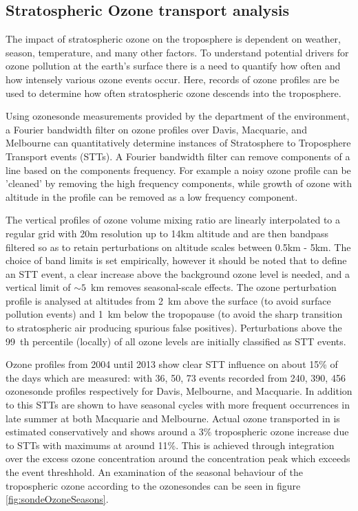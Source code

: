 \subsection{Stratospheric Ozone transport analysis}
The impact of stratospheric ozone on the troposphere is dependent on weather, season, temperature, and many other factors.
To understand potential drivers for ozone pollution at the earth's surface there is a need to quantify how often and how intensely various ozone events occur.
Here, records of ozone profiles are be used to determine how often stratospheric ozone descends into the troposphere.

Using ozonesonde measurements provided by the department of the environment, a Fourier bandwidth filter on ozone profiles over Davis, Macquarie, and Melbourne can quantitatively determine instances of Stratosphere to Troposphere Transport events (STTs).
A Fourier bandwidth filter can remove components of a line based on the components frequency.
For example a noisy ozone profile can be 'cleaned' by removing the high frequency components, while growth of ozone with altitude in the profile can be removed as a low frequency component. 

The vertical profiles of ozone volume mixing ratio are linearly interpolated to a regular grid with 20m resolution up to 14km altitude and are then bandpass filtered so as to retain perturbations on altitude scales between 0.5km - 5km. 
The choice of band limits is set empirically, however it should be noted that to define an STT event, a clear increase above the background ozone level is needed, and a vertical limit of $\sim 5$~km removes seasonal-scale effects. 
The ozone perturbation profile is analysed at altitudes from 2~km above the surface (to avoid surface pollution events) and 1~km below the tropopause (to avoid the sharp transition to stratospheric air producing spurious false positives).
Perturbations above the 99~th percentile (locally) of all ozone levels are initially classified as STT events.

Ozone profiles from 2004 until 2013 show clear STT influence on about 15\% of the days which are measured: with 36, 50, 73 events recorded from 240, 390, 456 ozonesonde profiles respectively for Davis, Melbourne, and Macquarie.
In addition to this STTs are shown to have seasonal cycles with more frequent occurrences in late summer at both Macquarie and Melbourne.
Actual ozone transported in is estimated conservatively and shows around a 3\% tropospheric ozone increase due to STTs with maximums at around 11\%.
This is achieved through integration over the excess ozone concentration around the concentration peak which exceeds the event threshhold. 
An examination of the seasonal behaviour of the tropospheric ozone according to the ozonesondes can be seen in figure \ref{fig:sondeOzoneSeasons}.

